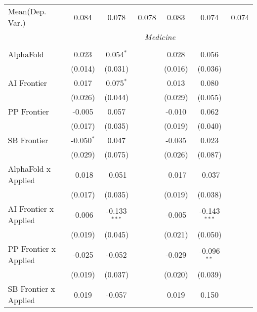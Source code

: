 \begin{tabular}{lcccccc}
Mean(Dep. Var.) & 0.084 & 0.078 & 0.078 & 0.083 & 0.074 & 0.074 \\
 & \multicolumn{6}{c}{\textit{Medicine}} \\ \\
   AlphaFold                      & 0.023        & 0.054$^{*}$    &                & 0.028   & 0.056          &   \\   
                                  & (0.014)      & (0.031)        &                & (0.016) & (0.036)        &   \\   
   AI Frontier                    & 0.017        & 0.075$^{*}$    &                & 0.013   & 0.080          &   \\   
                                  & (0.026)      & (0.044)        &                & (0.029) & (0.055)        &   \\   
   PP Frontier                    & -0.005       & 0.057          &                & -0.010  & 0.062          &   \\   
                                  & (0.017)      & (0.035)        &                & (0.019) & (0.040)        &   \\   
   SB Frontier                    & -0.050$^{*}$ & 0.047          &                & -0.035  & 0.023          &   \\   
                                  & (0.029)      & (0.075)        &                & (0.026) & (0.087)        &   \\   
   AlphaFold x Applied            & -0.018       & -0.051         &                & -0.017  & -0.037         &   \\   
                                  & (0.017)      & (0.035)        &                & (0.019) & (0.038)        &   \\   
   AI Frontier x Applied          & -0.006       & -0.133$^{***}$ &                & -0.005  & -0.143$^{***}$ &   \\   
                                  & (0.019)      & (0.045)        &                & (0.021) & (0.050)        &   \\   
   PP Frontier x Applied          & -0.025       & -0.052         &                & -0.029  & -0.096$^{**}$  &   \\   
                                  & (0.019)      & (0.037)        &                & (0.020) & (0.039)        &   \\   
   SB Frontier x Applied          & 0.019        & -0.057         &                & 0.019   & 0.150          &   \\   

\end{tabular}
